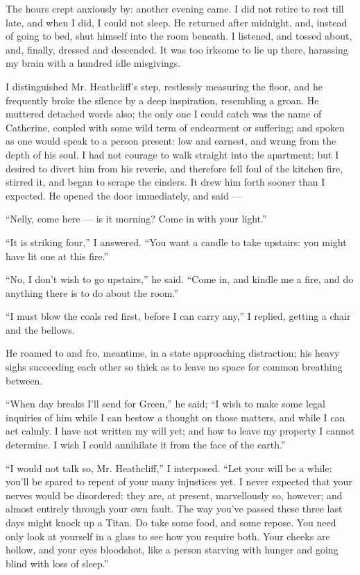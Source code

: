 \par The hours crept anxiously by: another evening came. I did not retire to rest till late, and when I did, I could not sleep. He returned after midnight, and, instead of going to bed, shut himself into the room beneath. I listened, and tossed about, and, finally, dressed and descended. It was too irksome to lie up there, harassing my brain with a hundred idle misgivings.
\par I distinguished Mr. Heathcliff's step, restlessly measuring the floor, and he frequently broke the silence by a deep inspiration, resembling a groan. He muttered detached words also; the only one I could catch was the name of Catherine, coupled with some wild term of endearment or suffering; and spoken as one would speak to a person present: low and earnest, and wrung from the depth of his soul. I had not courage to walk straight into the apartment; but I desired to divert him from his reverie, and therefore fell foul of the kitchen fire, stirred it, and began to scrape the cinders. It drew him forth sooner than I expected. He opened the door immediately, and said —
\par “Nelly, come here — is it morning? Come in with your light.”
\par “It is striking four,” I answered. “You want a candle to take upstairs: you might have lit one at this fire.”
\par “No, I don't wish to go upstairs,” he said. “Come in, and kindle me a fire, and do anything there is to do about the room.”
\par “I must blow the coals red first, before I can carry any,” I replied, getting a chair and the bellows.
\par He roamed to and fro, meantime, in a state approaching distraction; his heavy sighs succeeding each other so thick as to leave no space for common breathing between.
\par “When day breaks I'll send for Green,” he said; “I wish to make some legal inquiries of him while I can bestow a thought on those matters, and while I can act calmly. I have not written my will yet; and how to leave my property I cannot determine. I wish I could annihilate it from the face of the earth.”
\par “I would not talk so, Mr. Heathcliff,” I interposed. “Let your will be a while: you'll be spared to repent of your many injustices yet. I never expected that your nerves would be disordered: they are, at present, marvellously so, however; and almost entirely through your own fault. The way you've passed these three last days might knock up a Titan. Do take some food, and some repose. You need only look at yourself in a glass to see how you require both. Your cheeks are hollow, and your eyes bloodshot, like a person starving with hunger and going blind with loss of sleep.”
